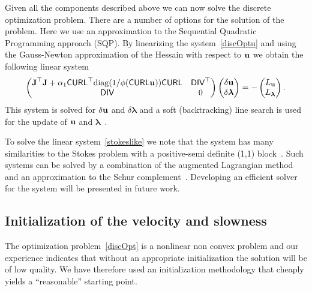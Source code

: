 \documentclass[english]{siamltex}
\newcommand {\bu}   { {\bf u} }          			%
\newcommand {\bfu}   { {\bf u} }
\newcommand {\bflambda}    {{\boldsymbol{\lambda}}}
\renewcommand {\diag}	 { \mathrm{diag} }
\newcommand{\bfJ}  {\text{{\bf J}}} %
\newcommand{\DIVh}   {{\textsf{DIV}}}  %
\newcommand{\CURLh}  {{\textsf{CURL}}} %
\begin{document}
Given all the components described above we can now solve the discrete optimization problem.
There are a number of options for the solution of the problem. Here we use an approximation to the Sequential 
Quadratic Programming approach (SQP). By linearizing the system~\eqref{discOptu} and using the Gauss-Newton approximation of the Hessain with respect to $ \bfu$
we obtain the following linear system
\begin{eqnarray}
\label{stokeslike}
\begin{pmatrix}
\bfJ^{\top} \bfJ + \alpha_{1} \CURLh^{\top} \diag(1/\phi(\CURLh \bu )) \CURLh & \DIVh^{\top} \\
\DIVh  & 0
\end{pmatrix}
\begin{pmatrix}
\delta \bfu \\ \delta \bflambda
\end{pmatrix}
 = -
\begin{pmatrix}
L_{ \bfu} \\ L_{\bflambda}
\end{pmatrix}.
\end{eqnarray}
This system is solved for $\delta  \bfu$ and $\delta \bflambda$
and a soft (backtracking) line search is used for the update of $\bfu$ and $\bflambda$~\cite{nw}.

To solve the linear system~\eqref{stokeslike} we note that the system has many similarities 
to the Stokes problem with a positive-semi definite (1,1) block~\cite{grgl}. Such
systems can be solved by a combination of the augmented Lagrangian method and an approximation
to the Schur complement~\cite{benziSurvey}.  Developing an efficient solver for the system 
will be presented in future work.


\subsection{Initialization of the velocity and slowness}
\label{sub:initialization}
The optimization problem~\eqref{discOpt} is a nonlinear  non convex problem and our experience indicates
that without an appropriate initialization the solution will be of low quality.
We have therefore used an initialization methodology that cheaply yields a ``reasonable'' starting point.
\end{document}
